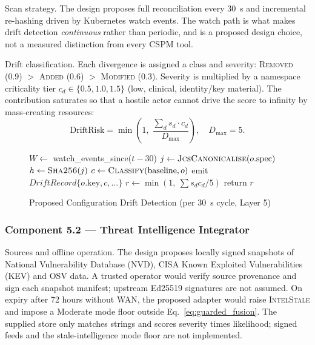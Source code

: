 \documentclass{ieeeaccess}
\renewcommand{\textbf}[1]{#1}
\begin{document}
\noindent\textbf{Scan strategy.} The design proposes full reconciliation every 30~s and incremental re-hashing driven by Kubernetes watch events. The watch path is what makes drift detection \emph{continuous} rather than periodic, and is a proposed design choice, not a measured distinction from every CSPM tool.

\noindent\textbf{Drift classification.} Each divergence is assigned a class and severity: \textsc{Removed} (0.9) $>$ \textsc{Added} (0.6) $>$ \textsc{Modified} (0.3). Severity is multiplied by a namespace criticality tier $c_d \in \{0.5, 1.0, 1.5\}$ (low, clinical, identity/key material). The contribution saturates so that a hostile actor cannot drive the score to infinity by mass-creating resources:
\begin{equation}
\text{DriftRisk} = \min\!\left(1,\;
\frac{\sum_{d} s_d \cdot c_d}{D_{\max}}\right), \quad D_{\max} = 5.
\label{eq:drift}
\end{equation}

\begin{figure}[ht]
\caption{Proposed Configuration Drift Detection (per 30~s cycle, Layer 5)}
\label{alg:drift}
\begin{algorithmic}[1]
\STATE $W \leftarrow$ watch\_events\_since($t-30$)
    \STATE $j \leftarrow \textsc{JcsCanonicalise}(o.\text{spec})$
    \STATE $h \leftarrow \textsc{Sha256}(j)$
        \STATE $c \leftarrow \textsc{Classify}(\text{baseline}, o)$
        \STATE \textbf{emit} $DriftRecord\{o.\text{key}, c, \dots\}$
    \ENDIF
\ENDFOR
\STATE $r \leftarrow \min(1,\ \sum s_d c_d / 5)$
\STATE \textbf{return} $r$
\end{algorithmic}
\end{figure}

\subsubsection{Component 5.2 --- Threat Intelligence Integrator}
\label{subsubsec:intel}

\noindent\textbf{Sources and offline operation.} The design proposes locally signed snapshots of National Vulnerability Database (NVD), CISA Known Exploited Vulnerabilities (KEV) and OSV data. A trusted operator would verify source provenance and sign each snapshot manifest; upstream Ed25519 signatures are not assumed. On expiry after 72 hours without WAN, the proposed adapter would raise \textsc{IntelStale} and impose a Moderate mode floor outside Eq.~\ref{eq:guarded_fusion}. The supplied store only matches strings and scores severity times likelihood; signed feeds and the stale-intelligence mode floor are not implemented.
\end{document}
